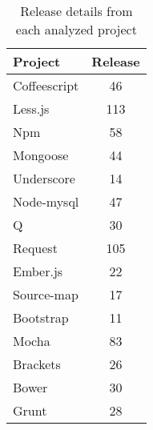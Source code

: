 \begin{table*}[!hbt]
    \begin{center}
        \caption{Release details from each analyzed project}
        \label{tab:evolution_overview}
        \begin{tabular}{l| c }
            \toprule
            \textbf{Project}  & \textbf{Release} \\ \midrule              
            Coffeescript    & 46  \\
            Less.js         & 113 \\
            Npm             & 58  \\
            Mongoose        & 44  \\
            Underscore      & 14  \\
            Node-mysql      & 47  \\
            Q               & 30  \\
            Request         & 105 \\
            Ember.js        & 22  \\
            Source-map      & 17  \\
            Bootstrap       & 11  \\
            Mocha           & 83  \\
            Brackets        & 26  \\
            Bower           & 30  \\
            Grunt           & 28  \\  \bottomrule
        \end{tabular}
    \end{center}
\end{table*}

